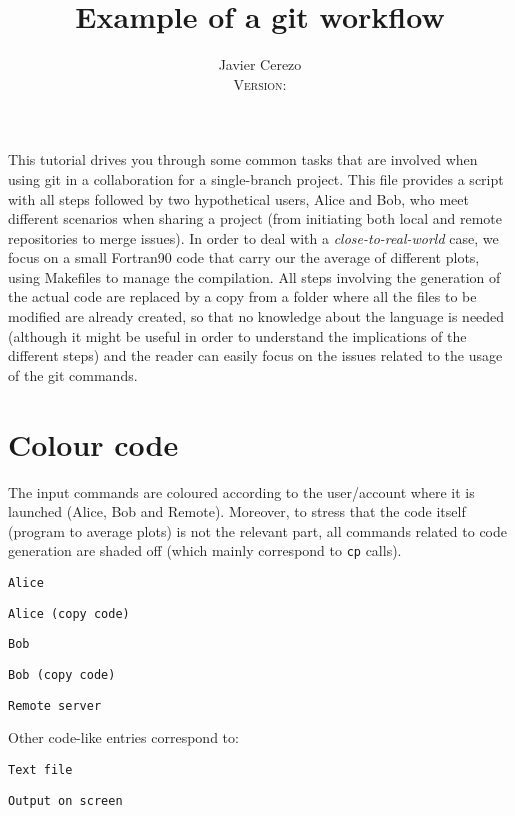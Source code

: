 \documentclass[a4paper,10pt]{article}
\title{Example of a git workflow}
\author{Javier Cerezo \\ 
\small\textsc{Version}: \gitversion}
\date{\gitdate}
\begin{document}
\maketitle

This tutorial drives you through some common tasks that are involved when using git in a collaboration for a single-branch project. This file provides a script with all steps followed by two hypothetical users, Alice and Bob, who meet different scenarios when sharing a project (from initiating both local and remote repositories to merge issues). In order to deal with a \textit{close-to-real-world} case, we focus on a small Fortran90 code that carry our the average of different plots, using Makefiles to manage the compilation. All steps involving the generation of the actual code are replaced by a copy from a folder where all the files to be modified are already created, so that no knowledge about the language is needed (although it might be useful in order to understand the implications of the different steps) and the reader can easily focus on the issues related to the usage of the git commands.

\section*{Colour code}
The input commands are coloured according to the user/account where it is launched (Alice, Bob and Remote). Moreover, to stress that the code itself (program to average plots) is not the relevant part, all commands related to code generation are shaded off (which mainly correspond to \texttt{cp} calls).

\begin{lstlisting}[style=Alice]
 Alice
\end{lstlisting}
\begin{lstlisting}[style=AliceFake]
 Alice (copy code)
\end{lstlisting}
\begin{lstlisting}[style=Bob]
 Bob
\end{lstlisting}
\begin{lstlisting}[style=BobFake]
 Bob (copy code)
\end{lstlisting}
\begin{lstlisting}[style=Remote]
 Remote server
\end{lstlisting}

Other code-like entries correspond to:

\begin{lstlisting}[style=Text]
 Text file
\end{lstlisting}
\begin{lstlisting}[style=Output]
 Output on screen
\end{lstlisting}
\end{document}
